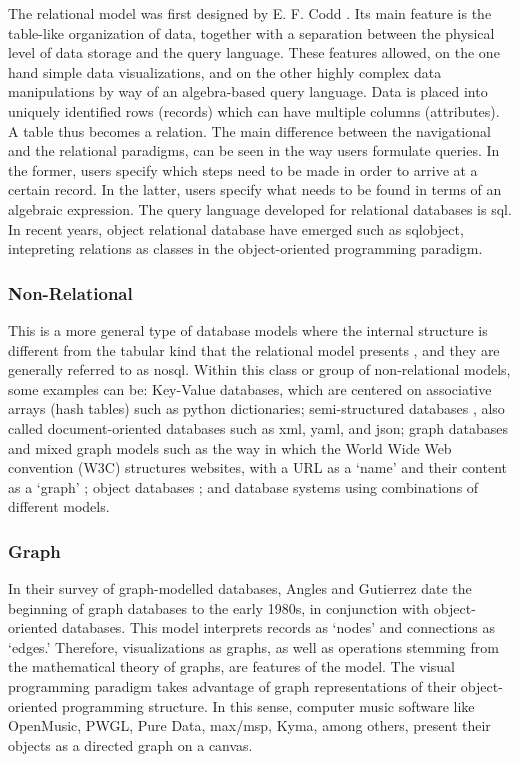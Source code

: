 The relational model was first designed by E. F. Codd \parencite{Codd:1970:RMD:362384.362685, Codd72relationalcompleteness}. Its main feature is the table-like organization of data, together with a separation between the physical level of data storage and the query language. These features allowed, on the one hand simple data visualizations, and on the other highly complex data manipulations by way of an algebra-based query language. Data is placed into uniquely identified rows (records) which can have multiple columns (attributes). A table thus becomes a relation. The main difference between the navigational and the relational paradigms, can be seen in the way users formulate queries. In the former, users specify which steps need to be made in order to arrive at a certain record. In the latter, users specify what needs to be found in terms of an algebraic expression. The query language developed for relational databases is \gls{sql}. In recent years, object relational database have emerged such as \gls{sqlobject}, intepreting relations as classes in the object-oriented programming paradigm.

\subsubsection{Non-Relational}
\label{model:nonrelational}

This is a more general type of database models where the internal structure is different from the tabular kind that the relational model presents , and they are generally referred to as \gls{nosql}. Within this class or group of non-relational models, some examples can be: Key-Value databases, which are centered on associative arrays (hash tables) such as python dictionaries; semi-structured databases , also called document-oriented databases such as \gls{xml}, \gls{yaml}, and \gls{json}; graph databases and mixed graph models such as the way in which the World Wide Web convention (W3C) structures websites, with a URL as a `name' and their content as a `graph' ; object databases ; and database systems using combinations of different models.

\subsubsection{Graph}
\label{model:graph}

In their survey of graph-modelled databases, Angles and Gutierrez \parencite{2008:graph/anglesgutierrez/survey} date the beginning of graph databases to the early 1980s, in conjunction with object-oriented databases. This model interprets records as `nodes' and connections as `edges.' Therefore, visualizations as graphs, as well as operations stemming from the mathematical theory of graphs, are features of the model. The visual programming paradigm takes advantage of graph representations of their object-oriented programming structure. In this sense, computer music software like OpenMusic, PWGL, Pure Data, \gls{max/msp}, Kyma, among others, present their objects as a directed graph on a canvas.

